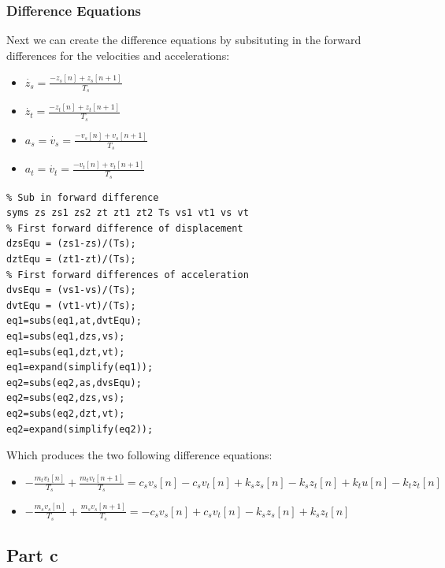 \documentclass[11pt]{article}
\begin{document}
\subsubsection{Difference Equations}
\label{sec:org752e860}
Next we can create the difference equations by subsituting in the forward differences for the velocities and accelerations:
\begin{itemize}
\item \(\dot{z_s} = \frac{- z_s[n] + z_s[n+1]}{T_s}\)
\item \(\dot{z_t} = \frac{- z_t[n] + z_t[n+1]}{T_s}\)
\item \(a_s = \dot{v_s} = \frac{- v_s[n] + v_s[n+1]}{T_s}\)
\item \(a_t = \dot{v_t} = \frac{- v_t[n] + v_t[n+1]}{T_s}\)
\end{itemize}
\begin{verbatim}
% Sub in forward difference
syms zs zs1 zs2 zt zt1 zt2 Ts vs1 vt1 vs vt
% First forward difference of displacement
dzsEqu = (zs1-zs)/(Ts);
dztEqu = (zt1-zt)/(Ts);
% First forward differences of acceleration
dvsEqu = (vs1-vs)/(Ts);
dvtEqu = (vt1-vt)/(Ts);
eq1=subs(eq1,at,dvtEqu);
eq1=subs(eq1,dzs,vs);
eq1=subs(eq1,dzt,vt);
eq1=expand(simplify(eq1));
eq2=subs(eq2,as,dvsEqu);
eq2=subs(eq2,dzs,vs);
eq2=subs(eq2,dzt,vt);
eq2=expand(simplify(eq2));
\end{verbatim}
Which produces the two following difference equations:
\begin{itemize}
\item \(-\frac{m_t v_t[n]}{T_s} + \frac{m_t v_t[n+1]}{T_s} = c_s v_s[n] - c_s v_t[n] + k_s z_s[n] - k_s z_t[n] + k_t u[n] - k_t z_t[n]\)
\item \(-\frac{m_s v_s[n]}{T_s} + \frac{m_s v_s[n+1]}{T_s} = - c_s v_s[n] + c_s v_t[n] - k_s z_s[n] + k_s z_t[n]\)
\end{itemize}
\subsection{Part c}
\label{sec:orgd8c82cd}
\end{document}

